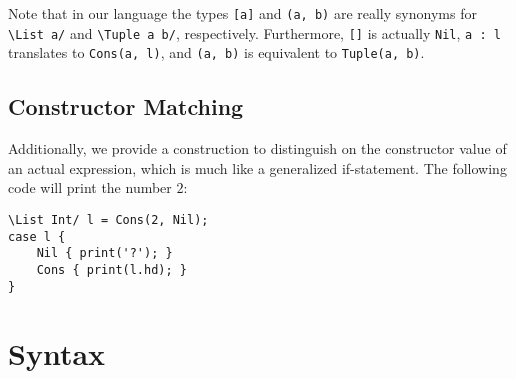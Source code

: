 \documentclass[a4paper]{article}
\begin{document}
Note that in our language the types \verb+[a]+ and \verb+(a, b)+ are really synonyms for \verb+\List a/+ and \verb+\Tuple a b/+, respectively.
Furthermore, \verb+[]+ is actually \verb+Nil+, \verb+a : l+ translates to \verb+Cons(a, l)+, and \verb+(a, b)+ is equivalent to \verb+Tuple(a, b)+.

\subsection{Constructor Matching}

Additionally, we provide a construction to distinguish on the constructor value of an actual expression, which is much like a generalized if-statement.
The following code will print the number $2$:
\begin{verbatim}
\List Int/ l = Cons(2, Nil);
case l {
    Nil { print('?'); }
    Cons { print(l.hd); }
}\end{verbatim}

\section{Syntax}
\end{document}
